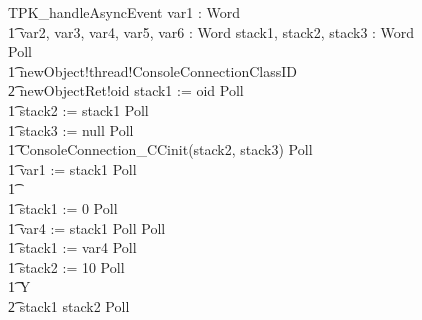 \begin{figure}[tp!]
  \centering
  \setlength{\zedtab}{0.5cm}
  \setlength{\zedindent}{0pt}
  \setlength{\zedleftsep}{0pt}
  \setlength{\abovedisplayskip}{0pt}
  \setlength{\belowdisplayskip}{0pt}
  \setlength{\abovedisplayshortskip}{0pt}
  \setlength{\belowdisplayshortskip}{0pt}
  \begin{circusaction}
    TPK\_handleAsyncEvent \circdef \circval var1 : Word \circspot \\
    \t1 \circvar var2, var3, var4, var5, var6 : Word \circspot \circvar stack1, stack2, stack3 : Word \circspot Poll \circseq \\
    \t1 newObject!thread!ConsoleConnectionClassID \\
    \t2 {} \then  newObjectRet!oid \then stack1 := oid \circseq Poll \circseq \\
    \t1 stack2 := stack1 \circseq Poll \circseq \\
    \t1 stack3 := null \circseq Poll \circseq \\
    \t1 ConsoleConnection\_CCinit(stack2, stack3) \circseq Poll \circseq \\
    \t1 var1 := stack1 \circseq Poll \circseq \\
    \t1 {} \cdots {} \\
    \t1 stack1 := 0 \circseq Poll \circseq \\
    \t1 var4 := stack1 \circseq Poll \circseq Poll \circseq \\
    \t1 stack1 := var4 \circseq Poll \circseq \\
    \t1 stack2 := 10 \circseq Poll \circseq \\
    \t1 \circmu Y \circspot \\
    \t2 \circif stack1 \leq stack2 \circthen Poll \circseq \\

\end{circusaction}
\end{figure}
